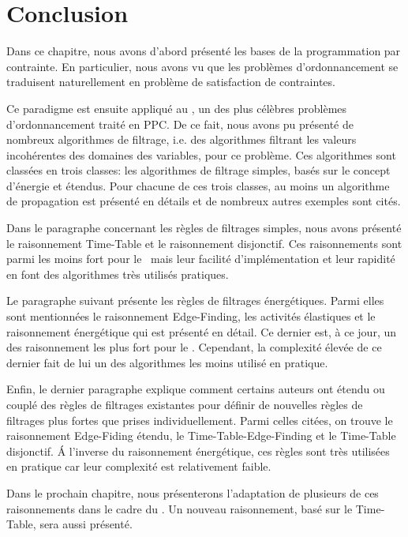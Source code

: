 \section*{Conclusion}

Dans ce chapitre, nous avons d'abord présenté les bases de la
programmation par contrainte. En particulier, nous avons vu que les
problèmes d'ordonnancement se traduisent naturellement en problème de
satisfaction de contraintes. 

Ce paradigme est ensuite appliqué au \CUSP, un des plus célèbres
problèmes d'ordonnancement traité en PPC. De ce fait, nous avons pu
présenté de nombreux algorithmes de filtrage, i.e. des algorithmes
filtrant les valeurs incohérentes des domaines des variables, pour ce
problème. Ces algorithmes sont classées en trois classes: les
algorithmes de filtrage simples, basés sur le concept d'énergie et
étendus. Pour chacune de ces trois classes, au moins un algorithme de
propagation est présenté en détails et de nombreux autres exemples
sont cités. 

Dans le paragraphe concernant les règles de filtrages simples, nous
avons présenté le raisonnement Time-Table et le raisonnement
disjonctif. Ces raisonnements sont parmi les moins fort pour le
\CUSP~mais leur facilité d'implémentation et leur rapidité en font des
algorithmes très utilisés pratiques. 

Le paragraphe suivant présente les règles de filtrages
énergétiques. Parmi elles sont mentionnées le raisonnement
Edge-Finding, les activités élastiques et le raisonnement énergétique
qui est présenté en détail. Ce dernier est, à ce jour, un des
raisonnement les plus fort pour le \CUSP. Cependant, la complexité
élevée de ce dernier fait de lui un des algorithmes les moins utilisé
en pratique.

Enfin, le dernier paragraphe explique comment certains auteurs ont
étendu ou couplé des règles de filtrages existantes pour définir de
nouvelles règles de filtrages plus fortes que prises
individuellement. Parmi celles citées, on trouve le raisonnement
Edge-Fiding étendu, le Time-Table-Edge-Finding et le Time-Table
disjonctif. {\'A} l'inverse du raisonnement énergétique, ces règles
sont très utilisées en pratique car leur complexité est relativement
faible. 

Dans le prochain chapitre, nous présenterons l'adaptation de plusieurs
de ces raisonnements dans le cadre du \CECSP. Un nouveau raisonnement,
basé sur le Time-Table, sera aussi présenté.